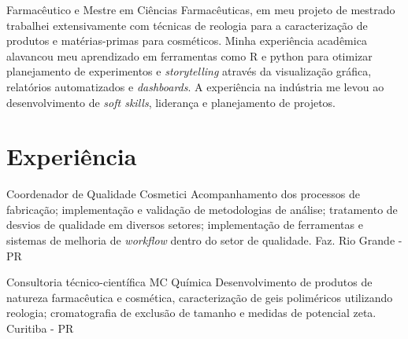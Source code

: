 
\begin{center}
    \small
        Farmacêutico e Mestre em Ciências Farmacêuticas, em meu projeto de mestrado trabalhei extensivamente com técnicas
        de reologia para a caracterização de produtos e matérias-primas para cosméticos.
        Minha experiência acadêmica alavancou meu aprendizado em ferramentas como R e python para otimizar planejamento
        de experimentos e \emph{storytelling} através da visualização gráfica, relatórios automatizados e \emph{dashboards}.
        A experiência na indústria me levou ao desenvolvimento de \emph{soft skills}, liderança e planejamento de projetos.
\end{center}
    
\section{Experiência}



{Coordenador de Qualidade}
{Cosmetici}
{
    Acompanhamento dos processos de fabricação;
    implementação e validação de metodologias de análise;
    tratamento de desvios de qualidade em diversos setores;
    implementação de ferramentas e sistemas de melhoria de \emph{workflow} 
    dentro do setor de qualidade.
}
{Faz. Rio Grande - PR}




{Consultoria técnico-científica}
{MC Química}
{
    Desenvolvimento de produtos de natureza farmacêutica e cosmética, 
    caracterização de geis poliméricos utilizando reologia;
    cromatografia de exclusão de tamanho e medidas de potencial zeta.
}
{Curitiba - PR}

